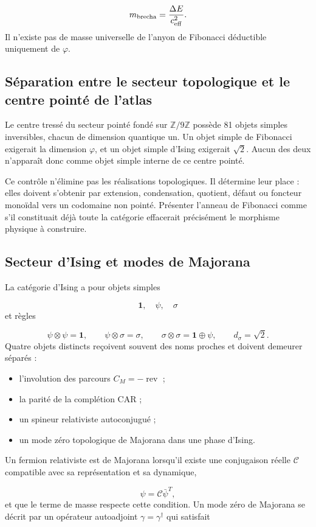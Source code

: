 \[
m_{\rm brecha}=\frac{\Delta E}{c_{\rm eff}^{2}}.
\]
Il n'existe pas de masse universelle de l'anyon de Fibonacci déductible uniquement de \(\varphi\).

\subsection{Séparation entre le secteur topologique et le centre pointé de l'atlas}
Le centre tressé du secteur pointé fondé sur \(\mathbb Z/9\mathbb Z\) possède 81 objets simples inversibles, chacun de dimension quantique un. Un objet simple de Fibonacci exigerait la dimension \(\varphi\), et un objet simple d'Ising exigerait \(\sqrt2\). Aucun des deux n'apparaît donc comme objet simple interne de ce centre pointé.

Ce contrôle n'élimine pas les réalisations topologiques. Il détermine leur place : elles doivent s'obtenir par extension, condensation, quotient, défaut ou foncteur monoïdal vers un codomaine non pointé. Présenter l'anneau de Fibonacci comme s'il constituait déjà toute la catégorie effacerait précisément le morphisme physique à construire.

\subsection{Secteur d'Ising et modes de Majorana}
La catégorie d'Ising a pour objets simples

\[
\mathbf1,\quad\psi,\quad\sigma
\]
et règles

\[
\psi\otimes\psi=\mathbf1,
\qquad
\psi\otimes\sigma=\sigma,
\qquad
\sigma\otimes\sigma=\mathbf1\oplus\psi,
\qquad
d_\sigma=\sqrt2.
\]
Quatre objets distincts reçoivent souvent des noms proches et doivent demeurer séparés :

\begin{itemize}
\item l'involution des parcours \(C_M=-\operatorname{rev}\) ;
\item la parité de la complétion CAR ;
\item un spineur relativiste autoconjugué ;
\item un mode zéro topologique de Majorana dans une phase d'Ising.
\end{itemize}
Un fermion relativiste est de Majorana lorsqu'il existe une conjugaison réelle \(\mathcal C\) compatible avec sa représentation et sa dynamique,

\[
\psi=\mathcal C\bar\psi^{T},
\]
et que le terme de masse respecte cette condition. Un mode zéro de Majorana se décrit par un opérateur autoadjoint \(\gamma=\gamma^\dagger\) qui satisfait

